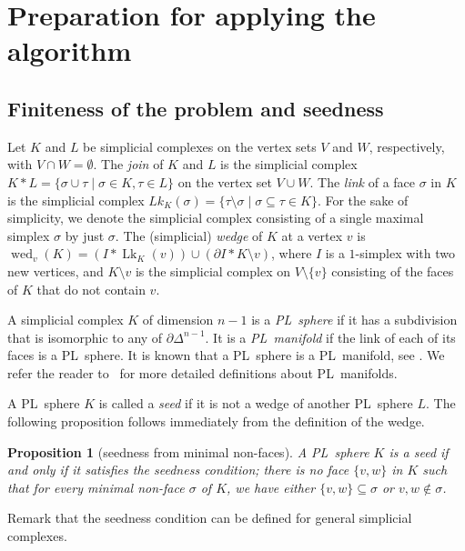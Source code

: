 \documentclass[11pt]{amsart}
\theoremstyle{plain}
\newtheorem{proposition}[theorem]{Proposition}
\numberwithin{equation}{section}
\theoremstyle{definition}
\DeclareMathOperator{\Lk}{Lk}
\DeclareMathOperator{\wed}{wed}
\begin{document}
\section{Preparation for applying the algorithm} \label{section:preparation}


\subsection{Finiteness of the problem and seedness}\label{subsection:finiteness}
Let $K$ and $L$ be simplicial complexes on the vertex sets $V$ and $W$, respectively, with $V\cap W=\emptyset$.
The \emph{join} of $K$ and $L$ is the simplicial complex $K \ast L = \{\sigma \cup \tau \mid \sigma \in K, \tau \in L \}$ on the vertex set $V\cup W$.
The \emph{link} of a face $\sigma$ in $K$ is the simplicial complex $Lk_K(\sigma)=\{ \tau \setminus \sigma \mid \sigma \subseteq \tau \in K \}$.
For the sake of simplicity, we denote the simplicial complex consisting of a single maximal simplex $\sigma$ by just $\sigma$.
The (simplicial) \emph{wedge} of $K$ at a vertex $v$ is $\wed_{v}(K)=(I*\Lk_{K}(v)) \cup (\partial I*K \setminus v)$, where $I$ is a $1$-simplex with two new vertices, and $K \setminus v$ is the simplicial complex on $V \setminus \{v\}$ consisting of the faces of $K$ that do not contain $v$.

A simplicial complex $K$ of dimension $n-1$ is a \emph{PL~sphere} if it has a subdivision that is isomorphic to any of  $\partial \Delta^{n-1}$.
It is a \emph{PL~manifold} if the link of each of its faces is a PL~sphere.
It is known that a PL~sphere is a PL~manifold, see \cite[Lemma~1.17]{hudson1969piecewise}.
We refer the reader to~\cite{Bagchi_Datta_1998} for more detailed definitions about PL~manifolds.

A PL~sphere $K$ is called a \emph{seed} if it is not a wedge of another PL~sphere $L$.
The following proposition follows immediately from the definition of the wedge.
\begin{proposition}[seedness from minimal non-faces]\label{proposition:seed no couple}
	A PL~sphere $K$ is a seed if and only if it satisfies the seedness condition; there is no face $\{v,w\}$ in $K$ such that for every minimal non-face $\sigma$ of $K$, we have either $\{v,w\}\subseteq \sigma$ or $v,w\notin \sigma$.
\end{proposition}
Remark that the seedness condition can be defined for general simplicial complexes.
\end{document}
